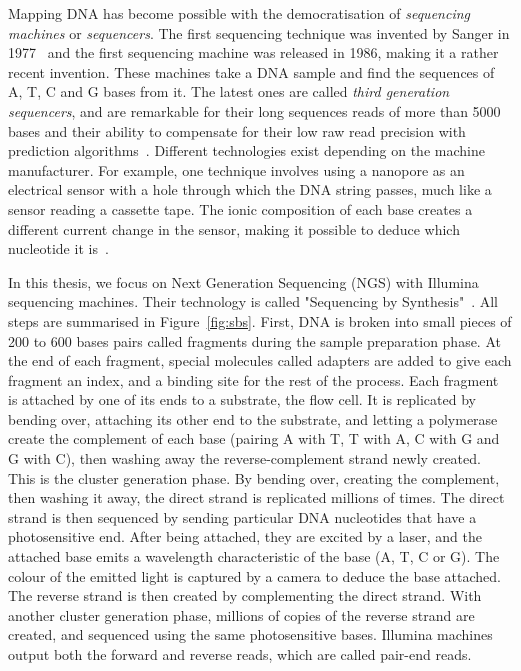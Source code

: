 Mapping DNA has become possible with the democratisation of \emph{sequencing machines} or \emph{sequencers}. The first sequencing technique was invented by Sanger in 1977~\cite{Sanger:sequencing} and the first sequencing machine was released in 1986, making it a rather recent invention. These machines take a DNA sample and find the sequences of A, T, C and G bases from it. The latest ones are called \emph{third generation sequencers}, and are remarkable for their long sequences reads of more than 5000 bases and their ability to compensate for their low raw read precision with prediction algorithms~\cite{Lee048603}. Different technologies exist depending on the machine manufacturer. For example, one technique involves using a nanopore as an electrical sensor with a hole through which the DNA string passes, much like a sensor reading a cassette tape. The ionic composition of each base creates a different current change in the sensor, making it possible to deduce which nucleotide it is~\cite{Oxford:nanopore}.

In this thesis, we focus on Next Generation Sequencing (NGS) with Illumina sequencing machines. Their technology is called "Sequencing by Synthesis"~\cite{illumina:sbs}. All steps are summarised in Figure~\ref{fig:sbs}. First, DNA is broken into small pieces of 200 to 600 bases pairs called fragments during the sample preparation phase. At the end of each fragment, special molecules called adapters are added to give each fragment an index, and a binding site for the rest of the process. Each fragment is attached by one of its ends to a substrate, the flow cell. It is replicated by bending over, attaching its other end to the substrate, and letting a polymerase create the complement of each base (pairing A with T, T with A, C with G and G with C), then washing away the reverse-complement strand newly created. This is the cluster generation phase. By bending over, creating the complement, then washing it away, the direct strand is replicated millions of times. The direct strand is then sequenced by sending particular DNA nucleotides that have a photosensitive end. After being attached, they are excited by a laser, and the attached base emits a wavelength characteristic of the base (A, T, C or G). The colour of the emitted light is captured by a camera to deduce the base attached. The reverse strand is then created by complementing the direct strand. With another cluster generation phase, millions of copies of the reverse strand are created, and sequenced using the same photosensitive bases. Illumina machines output both the forward and reverse reads, which are called pair-end reads.

